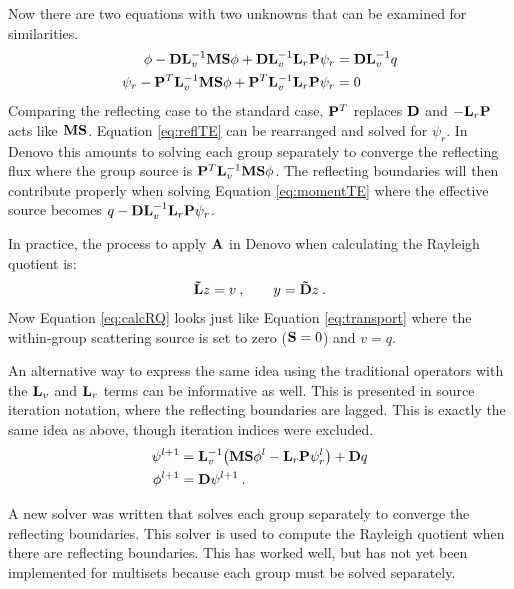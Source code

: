 Now there are two equations with two unknowns that can be examined for similarities.
\begin{align}
  \phi - \mathbf{DL}_{v}^{-1}\mathbf{MS}\phi + \mathbf{DL}_{v}^{-1}\mathbf{L}_{r}\mathbf{P} \psi_{r} &= \mathbf{DL}_{v}^{-1} q 
\label{eq:momentTE} \\
  \psi_{r} - \mathbf{P}^{T}\mathbf{L}_{v}^{-1}\mathbf{MS} \phi + \mathbf{P}^{T}\mathbf{L}_{v}^{-1} \mathbf{L}_{r} \mathbf{P} \psi_{r} &= 0 
\label{eq:reflTE}
\end{align}
Comparing the reflecting case to the standard case, $\mathbf{P}^{T}$ replaces $\mathbf{D}$ and $-\mathbf{L}_{r}\mathbf{P}$ acts like $\mathbf{MS}$. Equation \eqref{eq:reflTE} can be rearranged and solved for $\psi_{r}$. In Denovo this amounts to solving each group separately to converge the reflecting flux where the group source is $\mathbf{P}^{T}\mathbf{L}_{v}^{-1}\mathbf{MS} \phi$. The reflecting boundaries will then contribute properly when solving Equation \eqref{eq:momentTE} where the effective source becomes $q - \mathbf{DL}_{v}^{-1}\mathbf{L}_{r}\mathbf{P} \psi_{r}$.  

In practice, the process to apply $\mathbf{A}$ in Denovo when calculating the Rayleigh quotient is:
%
\begin{alignat}{2}
  \mathbf{\tilde{L}} z = v \:, \qquad y = \mathbf{\tilde{D}}z \:.
\label{eq:calcRQ}
\end{alignat}
%
Now Equation \eqref{eq:calcRQ} looks just like Equation \eqref{eq:transport} where the within-group scattering source is set to zero ($\mathbf{S} = 0$) and $v = q$. 

An alternative way to express the same idea using the traditional operators with the $\mathbf{L}_{v}$ and $\mathbf{L}_{r}$ terms can be informative as well. This is presented in source iteration notation, where the reflecting boundaries are lagged. This is exactly the same idea as above, though iteration indices were excluded.
\begin{align}
  \psi^{l+1} &= \mathbf{L}_{v}^{-1} \bigl( \mathbf{MS} \phi^{l} - \mathbf{L}_{r} \mathbf{P} \psi_{r}^{l} \bigr) + \mathbf{D}q 
\label{eq:laggedSI} \\
  \phi^{l+1} &= \mathbf{D}\psi^{l+1} \:.
\end{align}

A new solver was written that solves each group separately to converge the reflecting boundaries. This solver is used to compute the Rayleigh quotient when there are reflecting boundaries. This has worked well, but has not yet been implemented for multisets because each group must be solved separately. 


